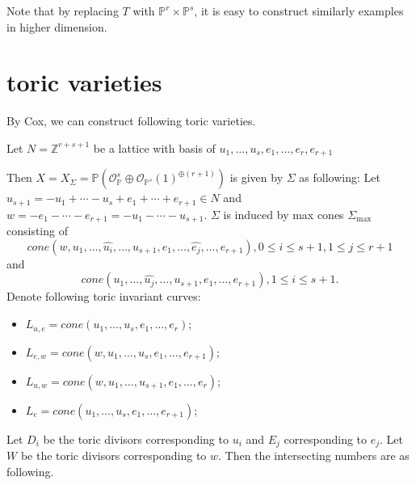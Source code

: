 \documentclass{article}
\begin{document}
\begin{figure}[htbp]
\begin{center}
\label{fig!atiyah-flop}
\end{center}
\end{figure}

Note that by replacing $T$ with $\mathbb{P}^{r} \times \mathbb{P}^{s}$, it is easy to construct similarly examples in higher dimension.
\newpage
\section{toric varieties}
By Cox, we can construct following toric varieties.

Let $N=\mathbb{Z}^{r+s+1}$ be a lattice with basis of $u_{1},\ldots ,u_{s},e_{1},\ldots ,e_{r},e_{r+1} $

Then $X=X_\Sigma=\mathbb{P}(\mathcal{O}_{\mathbb{P}}^s\oplus {\mathcal{O}_{\mathbb{P}^s}(1)}^{\oplus (r+1)})$ is given by $\Sigma$ as following:
Let $u_{s+1}=-u_{1}+\cdots-u_{s}+e_{1}+\cdots+e_{r+1}\in N$ and $w=-e_{1}-\cdots-e_{r+1}=-u_{1}-\cdots -u_{s+1}$.
$\Sigma$ is induced by max  cones $\Sigma_{\max}$ consisting of 
\[
cone(w,u_{1},\ldots,\hat{u_i},\ldots,u_{s+1},e_{1},\ldots,\hat{e_{j}},\ldots,e_{r+1}), 0\leqslant i \leqslant s+1, 1 \leqslant j \leqslant r+1
\]
and 
\[
cone(u_{1},\ldots,\hat{u_{j}},\ldots,u_{s+1},e_{1},\ldots,e_{r+1}),1\leqslant i \leqslant s+1.
\]
Denote following toric invariant curves:
\begin{itemize}
  \item $L_{u,e}=cone(u_{1},\ldots ,u_{s},e_{1},\ldots ,e_{r})$;
  \item $L_{e,w}=cone(w,u_{1},\ldots ,u_{s},e_{1},\ldots ,e_{r+1})$;
  \item $L_{u,w}=cone(w,u_{1},\ldots ,u_{s+1},e_{1},\ldots ,e_{r})$;
  \item $L_{e}=cone(u_{1},\ldots ,u_{s},e_{1},\ldots ,e_{r+1})$;
\end{itemize}
Let $D_{i}$ be the toric divisors corresponding to $u_{i}$ and $E_{j}$ corresponding to $e_{j}$. Let $W$ be the toric divisors corresponding to $w$.  Then the intersecting numbers are as following. 
\end{document}
